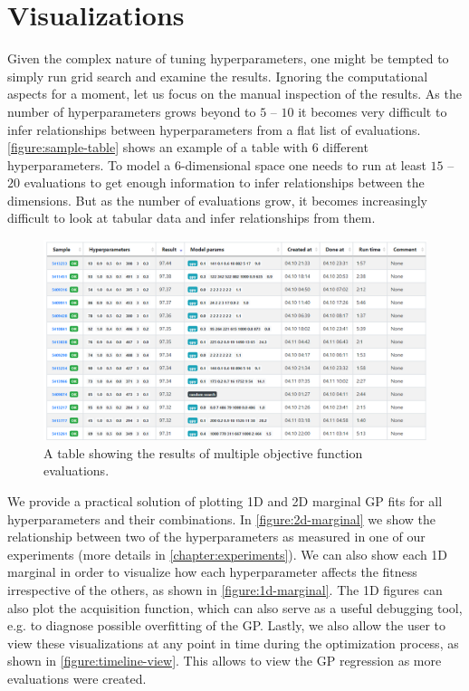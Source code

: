 \section{Visualizations}
\label{section:visualizations}

Given the complex nature of tuning hyperparameters, one might be tempted to simply run grid search and examine the results. Ignoring the computational aspects for a moment, let us focus on the manual inspection of the results. As the number of hyperparameters grows beyond to $5$ -- $10$ it becomes very difficult to infer relationships between hyperparameters from a flat list of evaluations. \autoref{figure:sample-table} shows an example of a table with $6$ different hyperparameters. To model a $6$-dimensional space one needs to run at least $15$ -- $20$ evaluations to get enough information to infer relationships between the dimensions. But as the number of evaluations grow, it becomes increasingly difficult to look at tabular data and infer relationships from them.

\begin{figure}
	\begin{center}
		\includegraphics[width=1.0\textwidth]{images/sample-table.png}
		\caption{A table showing the results of multiple objective function evaluations.}
	\end{center}
\end{figure}
\label{figure:sample-table}

We provide a practical solution of plotting 1D and 2D marginal GP fits for all hyperparameters and their combinations. In \autoref{figure:2d-marginal} we show the relationship between two of the hyperparameters as measured in one of our experiments (more details in \autoref{chapter:experiments}). We can also show each 1D marginal in order to visualize how each hyperparameter affects the fitness irrespective of the others, as shown in \autoref{figure:1d-marginal}. The 1D figures can also plot the acquisition function, which can also serve as a useful debugging tool, e.g. to diagnose possible overfitting of the GP. Lastly, we also allow the user to view these visualizations at any point in time during the optimization process, as shown in \autoref{figure:timeline-view}. This allows to view the GP regression as more evaluations were created.

